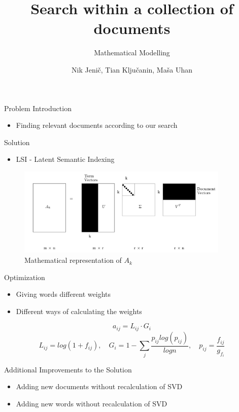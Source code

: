 \documentclass{beamer}
\title{Search within a collection of documents}
\subtitle{Mathematical Modelling}
\author{Nik Jenič, Tian Ključanin, Maša Uhan}
\date{}
\begin{document}
\frame{\titlepage}

\begin{frame}{Problem Introduction}
    \begin{itemize}
        \item Finding relevant documents according to our search
    \end{itemize}
\end{frame}

\begin{frame}{Solution}
    \begin{itemize}
        \item LSI - Latent Semantic Indexing
    \end{itemize}
    \begin{figure}
        \centering
        \includegraphics[width=0.9\textwidth]{../Slike/svd.png}
        \caption{Mathematical representation of $A_k$}
        \label{fig:matrixA}
      \end{figure}
\end{frame}

\begin{frame}{Optimization}
    \begin{itemize}
        \item Giving words different weights
        \item Different ways of calculating the weights
    \end{itemize}
    \begin{center}
        \[
            a_{ij} = L_{ij} \cdot G_i
        \]
        \[
            L_{ij} = log(1 + f_{ij}), \quad G_i = 1 - \sum_{j} \frac{p_{ij} log(p_{ij})}{log n}, \quad p_{ij} = \frac{f_{ij}}{g_{f_i}}
        \]
    \end{center}
\end{frame}

\begin{frame}{Additional Improvements to the Solution}
    \begin{itemize}
        \item Adding new documents without recalculation of SVD
        \item Adding new words without recalculation of SVD
    \end{itemize}
\end{frame}
\end{document}
